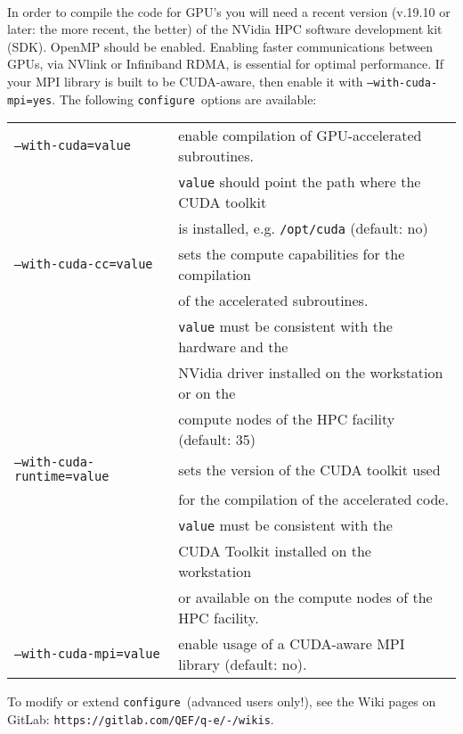 \documentclass[12pt,a4paper]{article}
\def\configure{\texttt{configure}}
\begin{document}
\\
In order to compile the code for GPU's you will need a recent version
(v.19.10 or later: the more recent, the better) of the NVidia HPC software
development kit (SDK). OpenMP should be enabled. Enabling faster communications
between GPUs, via NVlink or Infiniband RDMA, is essential for optimal
performance. If your MPI library is built to be CUDA-aware, then enable it
with \texttt{--with-cuda-mpi=yes}. The following \configure\ options are
available:\\
\begin{tabular}{ll}
\texttt{--with-cuda=value}&         enable compilation of GPU-accelerated subroutines.\\
                          &         \texttt{value} should point the path where the CUDA toolkit \\
                          &         is installed, e.g. \texttt{/opt/cuda} (default: no)\\
\texttt{--with-cuda-cc=value}&      sets the compute capabilities for the compilation\\
                             &      of the accelerated subroutines. \\
                             &      \texttt{value} must be consistent with the hardware and the\\
                             &      NVidia driver installed on the workstation or on the\\
                             &      compute nodes of the HPC facility (default: 35)\\
\texttt{--with-cuda-runtime=value}& sets the version of the CUDA toolkit used \\
                                  & for the compilation of the accelerated code.\\
                                  & \texttt{value} must be consistent with the\\
                                  & CUDA Toolkit installed on the workstation \\
                                  & or available on the compute nodes of the HPC facility.\\
\texttt{--with-cuda-mpi=value}    & enable usage of a CUDA-aware MPI library (default: no).\\
\end{tabular}

To modify or extend \configure\ (advanced users only!), see the Wiki pages
on GitLab: \texttt{https://gitlab.com/QEF/q-e/-/wikis}.
\end{document}
